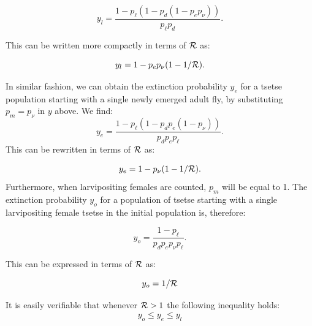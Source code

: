 \documentclass[smallextended]{svjour3}
\begin{document}
	$$y_l = \frac{1-p_{\ell}(1 - p_{d}(1 - p_{e}p_{\nu}))}{p_{\ell}p_{d}}.$$
	
	This can be written more compactly in terms of ${\cal R}$ as:
	
	\begin{equation}
	\label{larvExtinction}
	y_l = 1 - p_ep_{\nu}(1-1/{\cal R}).
	\end{equation}
	
	In similar fashion, we can obtain the extinction probability $y_e$ for a tsetse population starting with a single newly emerged adult fly, by substituting  $p_m = p_{\nu}$ in $y$ above.
	We find:
	$$ y_e=\frac{1- p_{\ell}(1 -p_{d}p_{e}(1- p_{\nu}))}{p_{d}p_{e}p_{\ell}}. $$ This can be rewritten in terms of ${\cal R}$ as:
	
	\begin{equation}
	\label{emergeExtinction}
	y_e = 1 - p_{\nu}(1-1/{\cal R}).	
	\end{equation}
	Furthermore, when  larvipositing females are counted, $p_m$ will be equal to 1. The extinction probability $y_o$ for a population of tsetse starting with a single larvipositing female tsetse in the initial population is, therefore:
	
	$$y_o = \frac{1-p_{\ell}}{p_{d}p_{e}p_{\nu}p_{\ell}}.$$
	
	This can be expressed in terms of ${\cal R}$ as:
	
	\begin{equation}
	\label{matureExtinction}
	y_o = 1/{\cal R}	
	\end{equation}
	
	It is easily verifiable that whenever ${\cal R}>1$ the following inequality holds:
	\begin{equation}
	\label{Aretsetsetheorem}
	y_{o}\leq y_{e} \leq y_{l}
	\end{equation} 
	
	
\end{document}
